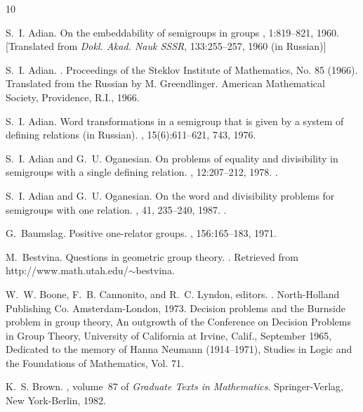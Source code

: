 \documentclass{amsart}
\theoremstyle{plain}
\theoremstyle{definition}
\begin{document}
\begin{thebibliography}{10}

S.~I. Adian.
\newblock On the embeddability of semigroups in groups , 1:819--821, 1960.  [Translated from {\em Dokl. Akad. Nauk SSSR}, 133:255--257, 1960 (in Russian)]

S.~I. Adian.
.
\newblock Proceedings of the Steklov Institute of Mathematics, No. 85 (1966).
  Translated from the Russian by M. Greendlinger. American Mathematical
  Society, Providence, R.I., 1966.

S.~I. Adian.
\newblock Word transformations in a semigroup that is given by a system of
  defining relations (in Russian).
, 15(6):611--621, 743, 1976.

S.~I. Adian and G.~U. Oganesian.
\newblock On problems of equality and divisibility in semigroups with a single
  defining relation.
, 12:207--212, 1978.
.

S.~I. Adian and G.~U. Oganesian.
\newblock On the word and divisibility problems for semigroups with one relation.
\newblock 
{}, 41, 235--240, 1987. 
. 



G.~Baumslag.
\newblock Positive one-relator groups.
, 156:165--183, 1971.

M.~Bestvina.
\newblock Questions in geometric group theory.
.
\newblock Retrieved from http://www.math.utah.edu/$\sim$bestvina.

W.~W. Boone, F.~B. Cannonito, and R.~C. Lyndon, editors.
.
\newblock North-Holland Publishing Co. Amsterdam-London, 1973.
\newblock Decision problems and the Burnside problem in group theory, An
  outgrowth of the Conference on Decision Problems in Group Theory, University
  of California at Irvine, Calif., September 1965, Dedicated to the memory of
  Hanna Neumann (1914--1971), Studies in Logic and the Foundations of
  Mathematics, Vol. 71.

K.~S. Brown.
, volume~87 of {\em Graduate Texts in
  Mathematics}.
\newblock Springer-Verlag, New York-Berlin, 1982.


\end{thebibliography}
\end{document}

